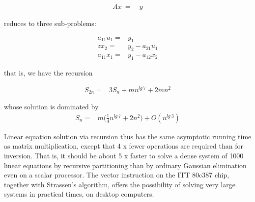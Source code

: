 \begin{align*}
Ax\ =&\ y
\end{align*}

reduces to three sub-problems:

\begin{align}
    a_{11}u_{1} =& y_{1}                 \\
         zx_{2} =& y_{2} - a_{21}{u}_1   \\
    a_{11}x_{1} =& y_{1} - a_{12}x_{2}
\end{align}

that is, we have the recursion

\begin{align}
S_{2n} =& 3S_{n} + mn^{lg\ 7} + 2mn^{2}
\end{align}

whose solution is dominated by
\begin{align}
S_{n} =& m\bigg(\frac{1}{4}n^{lg\ 7} + 2n^{2}\bigg) + O(n^{lg\ 3})
\end{align}

Linear equation solution via recursion thus has the same asymptotic running time as matrix multiplication, except that 4 x fewer operations are required than for inversion. That is, it should be about 5 x faster to solve a dense system of 1000 linear equations by recursive partitioning than by ordinary Gaussian elimination even on a scalar processor. The vector instruction on the ITT 80c387 chip, together with Strassen's algorithm, offers the possibility of solving very large systems in practical times, on desktop computers.